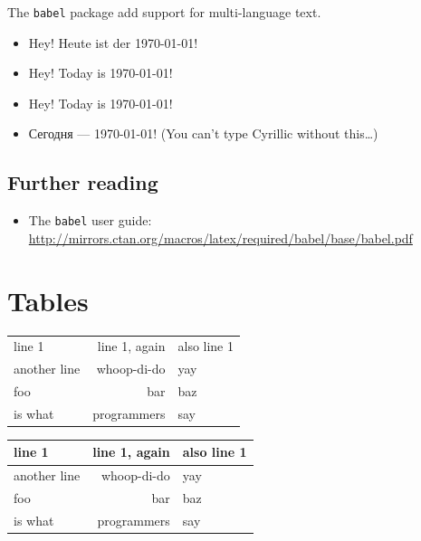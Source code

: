\documentclass{scrartcl}
\begin{document}
The \texttt{babel} package add support for multi-language text.

\begin{itemize}
  \item {Hey! Heute ist der \today!}
  \item {Hey! Today is \today!}
  \item {Hey! Today is \today!}
  \item {Сегодня --- \today!}
    (You can't type Cyrillic without this\dots)
\end{itemize}

\subsection*{Further reading}

\begin{itemize}
  \item The \texttt{babel} user guide: \\
    \url{http://mirrors.ctan.org/macros/latex/required/babel/base/babel.pdf}
\end{itemize}

\section{Tables}

\begin{center}
  \begin{tabular}{lrl}
    line 1 & line 1, again & also line 1 \\
    another line & whoop-di-do & yay \\
    foo & bar & baz \\
    is what & programmers & say \\
  \end{tabular}
\end{center}

\begin{center}
  \begin{tabular}{|l|r|l|}
    \hline
    line 1 & line 1, again & also line 1 \\
    \hline
    another line & whoop-di-do & yay \\
    \hline
    foo & bar & baz \\
    \hline
    is what & programmers & say \\
    \hline
  \end{tabular}
\end{center}
\end{document}
